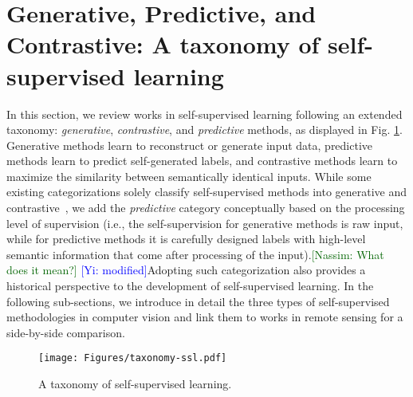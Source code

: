 \documentclass[lettersize,journal]{IEEEtran}
\newcommand{\kibitz}[2]{\ifnum\Comments=1\textcolor{#1}{#2}\fi}
\newcommand{\nassim}[1]{\kibitz{darkgreen}      {[Nassim: #1]}}
\newcommand{\yi}[1]  {\kibitz{blue}   {[Yi: #1]}}
\begin{document}
\section{Generative, Predictive, and Contrastive: A taxonomy of self-supervised learning}


In this section, we review works in self-supervised learning following an extended
taxonomy: \textit{generative}, \textit{contrastive}, and \textit{predictive} methods, as displayed in Fig. \ref{fig:taxonomy-ssl}. Generative methods learn to reconstruct or generate input data, predictive methods learn to predict self-generated labels, and contrastive methods learn to maximize the similarity between semantically identical inputs. While some existing categorizations solely classify self-supervised methods into generative and contrastive~\cite{jaiswal2021survey,liu2021self}, we add the \textit{predictive} category conceptually based on the processing level of supervision (i.e., the self-supervision for generative methods is raw input, while for predictive methods it is carefully designed labels with high-level semantic information that come after processing of the input).\nassim{What does it mean?} \yi{modified}Adopting such categorization also provides a historical perspective to the development of self-supervised learning. In the following sub-sections, we introduce in detail the three types of self-supervised methodologies in computer vision and link them to works in remote sensing for a side-by-side comparison.
\begin{figure}
\centering
\texttt{[image: Figures/taxonomy-ssl.pdf]}
\caption[taxonomy-ssl]{A taxonomy of self-supervised learning.}
\label{fig:taxonomy-ssl}
\end{figure}
\end{document}
